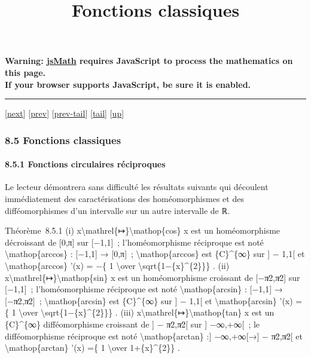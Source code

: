 \documentclass[]{article}
\title{Fonctions classiques}
\author{}
\date{}
\begin{document}
\maketitle

\textbf{Warning: \href{http://www.math.union.edu/locate/jsMath}{jsMath}
requires JavaScript to process the mathematics on this page.\\ If your
browser supports JavaScript, be sure it is enabled.}

\begin{center}\rule{3in}{0.4pt}\end{center}

{[}\href{coursse49.html}{next}{]} {[}\href{coursse47.html}{prev}{]}
{[}\href{coursse47.html\#tailcoursse47.html}{prev-tail}{]}
{[}\hyperref[tailcoursse48.html]{tail}{]}
{[}\href{coursch9.html\#coursse48.html}{up}{]}

\subsubsection{8.5 Fonctions classiques}

\paragraph{8.5.1 Fonctions circulaires réciproques}

Le lecteur démontrera sans difficulté les résultats suivants qui
découlent immédiatement des caractérisations des homéomorphismes et des
difféomorphismes d'un intervalle sur un autre intervalle de ℝ.

Théorème~8.5.1 (i)
x\textbackslash{}mathrel\{↦\}\textbackslash{}mathop\{cos\} x est un
homéomorphisme décroissant de {[}0,π{]} sur {[}−1,1{]}~;
l'homéomorphisme réciproque est noté \textbackslash{}mathop\{arccos\} :
{[}−1,1{]} → {[}0,π{]}~; \textbackslash{}mathop\{arccos\} est
\{C\}\^{}\{∞\} sur {]} − 1,1{[} et \textbackslash{}mathop\{arccos\} '(x)
= −\{ 1 \textbackslash{}over \textbackslash{}sqrt\{1−\{x\}\^{}\{2\}\}\}
. (ii) x\textbackslash{}mathrel\{↦\}\textbackslash{}mathop\{sin\} x est
un homéomorphisme croissant de {[}−π∕2,π∕2{]} sur {[}−1,1{]}~;
l'homéomorphisme réciproque est noté \textbackslash{}mathop\{arcsin\} :
{[}−1,1{]} → {[}−π∕2,π∕2{]}~; \textbackslash{}mathop\{arcsin\} est
\{C\}\^{}\{∞\} sur {]} − 1,1{[} et \textbackslash{}mathop\{arcsin\} '(x)
=\{ 1 \textbackslash{}over \textbackslash{}sqrt\{1−\{x\}\^{}\{2\}\}\} .
(iii) x\textbackslash{}mathrel\{↦\}\textbackslash{}mathop\{tan\} x est
un \{C\}\^{}\{∞\} difféomorphisme croissant de {]} − π∕2,π∕2{[} sur {]}
−∞,+∞{[}~; le difféomorphisme réciproque est noté
\textbackslash{}mathop\{arctan\} :{]} −∞,+∞{[}→{]} − π∕2,π∕2{[} et
\textbackslash{}mathop\{arctan\} '(x) =\{ 1 \textbackslash{}over
1+\{x\}\^{}\{2\}\} .
\end{document}
